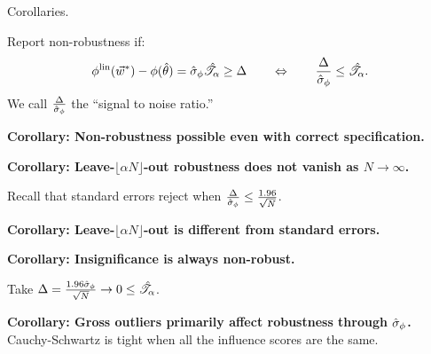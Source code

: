 
\begin{frame}{Corollaries.}


Report non-robustness if:
%
\begin{align*}
%
\thetafunlin(\w^*) - \thetafun(\thetahat)  = \noise \shape \ge \Delta
\quad\quad
\Leftrightarrow
\quad\quad
\frac{\Delta}{\noise} \le \shape.
%
\end{align*}
%
We call $\frac{\Delta}{\hat\sigma_{\phi}}$ the ``signal to noise ratio.''


\hrulefill


\pause
\vspace{0.5em}
\textbf{Corollary:  Non-robustness possible even with correct specification.}

\pause
\vspace{0.5em}
\textbf{Corollary:  Leave-$\lfloor \alpha N \rfloor$-out robustness does not vanish as $N \rightarrow \infty$.}
%

\pause
\vspace{0.5em}
Recall that standard errors reject when
$\frac{\Delta}{\hat\sigma_{\phi}} \le \frac{1.96}{\sqrt{N}}$.

\pause
\vspace{0.5em}
\textbf{Corollary:  Leave-$\lfloor \alpha N \rfloor$-out is different from standard errors.}

\pause
\vspace{0.5em}
\textbf{Corollary:  Insignificance is always non-robust.}

Take $\Delta = \frac{1.96 \hat \sigma_\phi}{\sqrt{N}} \rightarrow 0 \le
\hat{\mathscr{T}}_\alpha$.

\pause
\vspace{0.5em}
\textbf{Corollary:  Gross outliers primarily affect robustness
through $\hat\sigma_{\phi}$.}
Cauchy-Schwartz is tight when all the influence scores are the same.

\end{frame}
